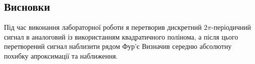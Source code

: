 \documentclass[oneside,14pt]{extarticle}
\begin{document}
\begin{normalsize}
	\section*{Висновки}
	Під час виконання лабораторної роботи я перетворив дискретний $2\pi$-періодичний сигнал в
аналоговий із використанням квадратичного полінома, а після цього
перетворений сигнал наблизити рядом Фур’є Визначив середню абсолютну похибку
апроксимації та наближення.
	    
\end{normalsize}
\end{document}
